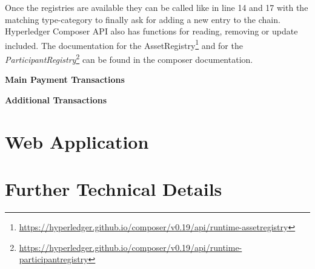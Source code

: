 Once the registries are available they can be called like in line 14 and 17 with the matching type-category to finally ask for adding a new entry to the chain. Hyperledger Composer API also has  functions for reading, removing or update included. The documentation for the AssetRegistry\footnote{\url{https://hyperledger.github.io/composer/v0.19/api/runtime-assetregistry}} and for the \textit{ParticipantRegistry}\footnote{\url{https://hyperledger.github.io/composer/v0.19/api/runtime-participantregistry}} can be found in the composer documentation.

\textbf{Main Payment Transactions}


\textbf{Additional Transactions}





\section{Web Application}
\label{sec:webapp}


\section{Further Technical Details}
\label{sec:technical-details}

